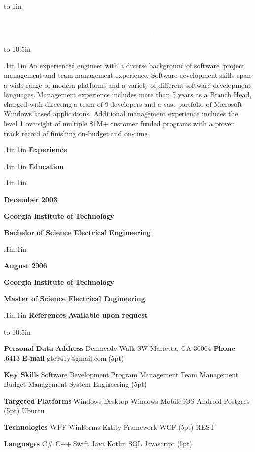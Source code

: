 \documentclass[paper=a4,fontsize=11pt]{scrartcl}
\newcommand{\MyName}[2]{
	\noindent
	\colorbox{myDarkGray}{
		\parbox{8.27in}{
		\vbox to 1in {
			\vfil
			\begin{minipage}[t]{0.8\textwidth}
			\textcolor{white}{
				\textbf{\Huge #1}\\
				\textbf{\Large #2}
			}
			\end{minipage}
			\vfil
		}
		}
		\par
	}
}
\newcommand{\MyNarrative}[1]{
	\begin{changemargin}{.1in}{.1in}
	#1
	\end{changemargin}
}
\newcommand{\PersonalData}[4]{
	\textbf{Personal Data}
	\myrule[1pt][5pt]
	\textbf{Address}
	\newline
	#1
	\newline
	#2
	\newline
	\textbf{Phone}
	\newline
	#3
	\newline
	\textbf{E-mail}
	\newline
	#4
	\vspace(5pt)
}
\newcommand{\KeySkills}[5]{
	\textbf{Key Skills}
	\myrule[1pt][5pt]
	#1
	\newline
	#2
	\newline
	#3
	\newline
	#4
	\newline
	#5
	\vspace(5pt)
}
\newcommand{\Platforms}[5]{
	\textbf{Targeted Platforms}
	\myrule[1pt][5pt]
	#1
	\newline
	#2
	\newline
	#3
	\newline
	#4
	\newline
	#5
	\vspace(5pt)
}
\newcommand{\TechnicalSkills}[4]{
	\textbf{Technologies}
	\myrule[1pt][5pt]
	#1
	\newline
	#2
	\newline
	#3
	\newline
	#4
	\vspace(5pt)
}
\newcommand{\Languages}[7]{
	\textbf{Languages}
	\myrule[1pt][5pt]
	#1
	\newline
	#2
	\newline
	#3
	\newline
	#4
	\newline
	#5
	\newline
	#6
	\newline
	#7
	\vspace(5pt)
}
\newcommand{\Experience}[1]{
	\begin{changemargin}{.1in}{.1in}
	\textbf{Experience}
	\myrule[1pt][5pt]
	\end{changemargin}
}
\newcommand{\EducationHeader}[1]{
	\begin{changemargin}{.1in}{.1in}
	\textbf{Education}
	\myrule[1pt][5pt]
	\end{changemargin}
}
\newcommand{\SchoolEntry}[3]{

	\setlength{\parskip}{.1em}
	\begin{changemargin}{.1in}{.1in}
		\begin{minipage}[t]{1.5in}
		\textbf{#1}
		\end{minipage}
		\begin{minipage}[t]{4.5in}			
	\begin{flushleft}
			\textbf{#2}
	\end{flushleft}
			\textbf{#3}
		\end{minipage}
	\end{changemargin}
	\vspace{15pt}
}
\newcommand{\References}{
	\begin{changemargin}{.1in}{.1in}
	\textbf{References}
	\myrule[1pt][5pt]
	\textbf{Available upon request}
	\end{changemargin}
}
\begin{document}
\MyName{Justin Fox}{Software Developer / Project Manager / Team Manager}
\begin{minipage}[t]{0.75\linewidth}
	\vspace{0pt}
	\colorbox{myOffWhite}{
		\vbox to 10.5in{
			\MyNarrative{An experienced engineer with a diverse background of software, project management and team management experience. Software development skills span a wide range of modern platforms and a variety of different software development languages. Management experience includes more than 5 years as a Branch Head, charged with directing a team of 9 developers and a vast portfolio of Microsoft Windows based applications. Additional management experience includes the level 1 oversight of multiple \$1M+ customer funded programs with a proven track record of finishing on-budget and on-time.}
			\Experience{}
			\EducationHeader{}
			\SchoolEntry{December 2003}{Georgia Institute of Technology}{Bachelor of Science Electrical Engineering}
			\SchoolEntry{August 2006}{Georgia Institute of Technology}{Master of Science Electrical Engineering}
			\References
			\vfil
		}
	}
\end{minipage}%
\begin{minipage}[t]{0.2\linewidth}
	\vspace{0pt}
	\vbox to 10.5in{
		\colorbox{myLightGray}{
			\vfil
			\PersonalData{975 Denmeade Walk SW}{Marietta, GA 30064}{404.903.6413}{gte941y@gmail.com}
			\newline
			\KeySkills{Software Development}{Program Management}{Team Management}{Budget Management}{System Engineering}
			\newline
			\Platforms{Windows Desktop}{Windows Mobile}{iOS}{Android}{Postgres}{Ubuntu}
			\newline
			\TechnicalSkills{WPF}{WinForms}{Entity Framework}{WCF}{REST}
			\newline
			\Languages{C\#}{C++}{Swift}{Java}{Kotlin}{SQL}{Javascript}
		}
	}
\end{minipage}
\end{document}
